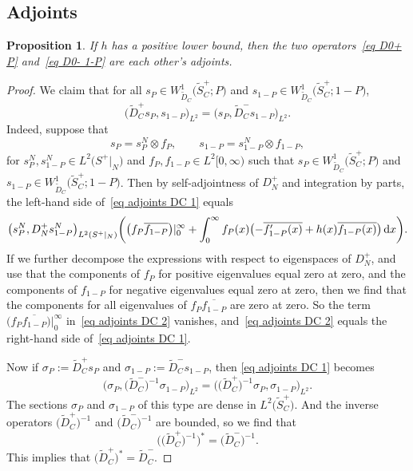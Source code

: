 \documentclass[pdftex]{sigma}%
\numberwithin{equation}{section}
\newtheorem{Proposition}[Theorem]{Proposition}
 { \theoremstyle{definition}
\newtheorem{Definition}[Theorem]{Definition}
\newtheorem{Note}[Theorem]{Note}
\newtheorem{Example}[Theorem]{Example}
\newtheorem{Remark}[Theorem]{Remark} }
\begin{document}
\subsection{Adjoints}\label{sec adjoints}

\begin{Proposition}\label{prop adjoints DC}
If $h$ has a positive lower bound, then
the two operators~\eqref{eq D0+ P} and~\eqref{eq D0- 1-P} are each other's adjoints.
\end{Proposition}
\begin{proof}
We claim that for all $s_P \in W^1_{\widetilde{D}_C}\big(\widetilde{S}_C^+; P\big)$ and $s_{1-P} \in W^1_{\widetilde{D}_C}\big(\widetilde{S}_C^+; 1-P\big)$,
\begin{equation}
\label{eq adjoints DC 1}
\big(\widetilde{D}_C^+ s_P, s_{1-P}\big)_{L^2} = \big(s_P, \widetilde{D}_C^- s_{1-P}\big)_{L^2}.
\end{equation}
Indeed, suppose that
\[
s_P = s_P^N \otimes f_{P},\qquad s_{1-P} = s_{1-P}^N \otimes f_{1-P},
\]
for $s_P^N, s_{1-P}^N \in L^2\big(S^+|_N\big)$ and $f_P, f_{1-P} \in L^2[0, \infty)$ such that $s_P \in W^1_{\widetilde{D}_C}\big(\widetilde{S}_C^+; P\big)$ and $s_{1-P} \in W^1_{\widetilde{D}_C}\big(\widetilde{S}_C^+; 1-P\big)$. Then by self-adjointness of $D_N^+$ and integration by parts, the left-hand side of~\eqref{eq adjoints DC 1} equals
\begin{equation} \label{eq adjoints DC 2}
\big(s_P^N, D_N^+ s_{1-P}^N\big)_{L^2(S^+|_N)} \bigg(
\big(f_P \overline{f_{1-P}}\big)|_{0}^{\infty} + \int_0^{\infty} f_P(x)\bigl(-\overline{f_{1-P}'(x)} +h(x) \overline{f_{1-P}(x)}\bigr)\, {\rm d}x\bigg).
\end{equation}
If we further decompose the expressions with respect to eigenspaces of $D_N^+$, and use that the components of $f_P$ for positive eigenvalues equal zero at zero, and the components of $f_{1-P}$ for negative eigenvalues equal zero at zero, then we find that the components for all eigenvalues of $f_P \overline{f_{1-P}}$ are zero at zero. So the term $\big(f_P \overline{f_{1-P}}\big)|_{0}^{\infty} $ in~\eqref{eq adjoints DC 2} vanishes, and~\eqref{eq adjoints DC 2} equals the right-hand side of~\eqref{eq adjoints DC 1}.

Now if $\sigma_P := \widetilde{D}_C^+ s_P$ and $\sigma_{1-P} := \widetilde{D}_C^- s_{1-P}$, then
\eqref{eq adjoints DC 1} becomes
\[
\big( \sigma_P, \big(\widetilde{D}_C^-\big)^{-1} \sigma_{1-P}\big)_{L^2} = \big( \big(\widetilde{D}_C^+\big)^{-1}\sigma_P, \sigma_{1-P}\big)_{L^2}.
\]
The sections $\sigma_P$ and $\sigma_{1-P}$ of this type are dense in $L^2\big(\widetilde{S}_C^+\big)$. And the inverse operators $\big(\widetilde{D}_C^+\big)^{-1}$ and $\big(\widetilde{D}_C^-\big)^{-1}$ are bounded, so we find that
\[
\big(\big(\widetilde{D}_C^+\big)^{-1}\big)^* = \big(\widetilde{D}_C^-\big)^{-1}.
\]
This implies that $\big(\widetilde{D}_C^+\big)^* = \widetilde{D}_C^-$.
\end{proof}
\end{document}
